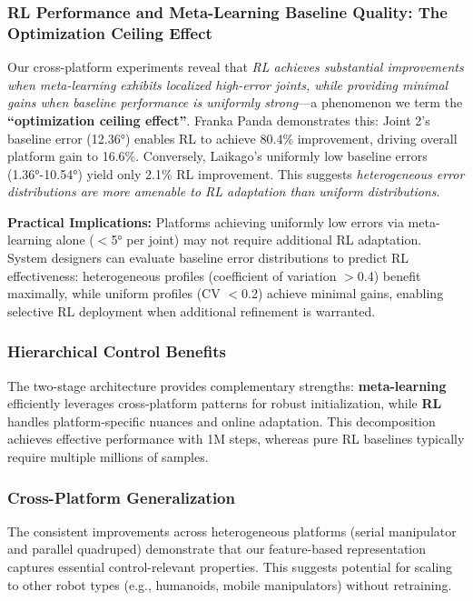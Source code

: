 \documentclass[a4paper]{cas-sc}
\begin{document}
\subsubsection{RL Performance and Meta-Learning Baseline Quality: The Optimization Ceiling Effect}

Our cross-platform experiments reveal that \textit{RL achieves substantial improvements when meta-learning exhibits localized high-error joints, while providing minimal gains when baseline performance is uniformly strong}—a phenomenon we term the \textbf{``optimization ceiling effect''}. Franka Panda demonstrates this: Joint 2's baseline error (12.36°) enables RL to achieve 80.4\% improvement, driving overall platform gain to 16.6\%. Conversely, Laikago's uniformly low baseline errors (1.36°-10.54°) yield only 2.1\% RL improvement. This suggests \textit{heterogeneous error distributions are more amenable to RL adaptation than uniform distributions}.

            	\textbf{Practical Implications:} Platforms achieving uniformly low errors via meta-learning alone ($<$5° per joint) may not require additional RL adaptation. System designers can evaluate baseline error distributions to predict RL effectiveness: heterogeneous profiles (coefficient of variation $>$0.4) benefit maximally, while uniform profiles (CV $<$0.2) achieve minimal gains, enabling selective RL deployment when additional refinement is warranted.

\subsubsection{Hierarchical Control Benefits}

The two-stage architecture provides complementary strengths: \textbf{meta-learning} efficiently leverages cross-platform patterns for robust initialization, while \textbf{RL} handles platform-specific nuances and online adaptation. This decomposition achieves effective performance with 1M steps, whereas pure RL baselines typically require multiple millions of samples.

\subsubsection{Cross-Platform Generalization}

The consistent improvements across heterogeneous platforms (serial manipulator and parallel quadruped) demonstrate that our feature-based representation captures essential control-relevant properties. This suggests potential for scaling to other robot types (e.g., humanoids, mobile manipulators) without retraining.
\end{document}
